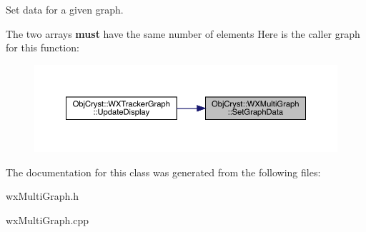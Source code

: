 Set data for a given graph.

The two arrays {\bfseries{must}} have the same number of elements Here is the caller graph for this function\+:
\nopagebreak
\begin{figure}[H]
\begin{center}
\leavevmode
\includegraphics[width=350pt]{class_obj_cryst_1_1_w_x_multi_graph_a09c95e65cdf98714bb4dedcbe4fec310_icgraph}
\end{center}
\end{figure}


The documentation for this class was generated from the following files\+:\begin{DoxyCompactItemize}
\item 
wx\+Multi\+Graph.\+h\item 
wx\+Multi\+Graph.\+cpp\end{DoxyCompactItemize}
